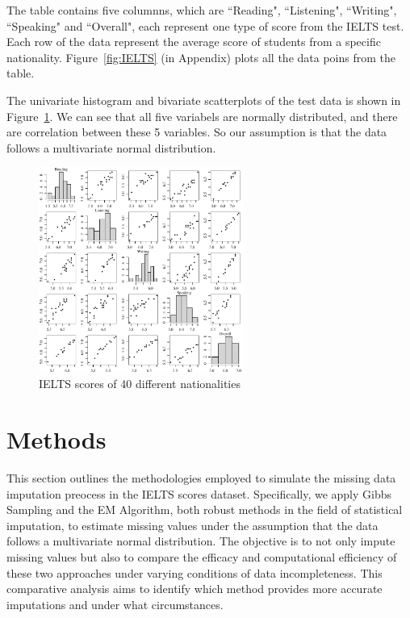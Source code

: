 \documentclass[12pt]{article}
\begin{document}
The table contains five columnns, which are ``Reading", ``Listening", ``Writing", ``Speaking" and ``Overall", each represent one type of score from the IELTS test. Each row of the data represent the average score of students from a specific nationality. Figure~\ref{fig:IELTS} (in Appendix) plots all the data poins from the table.

The univariate histogram and bivariate scatterplots of the test data is shown in Figure~\ref{fig:stats}. We can see that all five variabels are normally distributed, and there are correlation between these 5 variables. So our assumption is that the data follows a multivariate normal distribution.

\begin{figure}[htpb]
	\centering
	\includegraphics[width=0.6\textwidth]{pic/stat.pdf}
	\caption{IELTS scores of 40 different nationalities}
	\label{fig:stats}
\end{figure}

\section{Methods}

This section outlines the methodologies employed to simulate the missing data imputation preocess in the IELTS scores dataset. Specifically, we apply Gibbs Sampling and the EM Algorithm, both robust methods in the field of statistical imputation, to estimate missing values under the assumption that the data follows a multivariate normal distribution. The objective is to not only impute missing values but also to compare the efficacy and computational efficiency of these two approaches under varying conditions of data incompleteness. This comparative analysis aims to identify which method provides more accurate imputations and under what circumstances.
\end{document}
